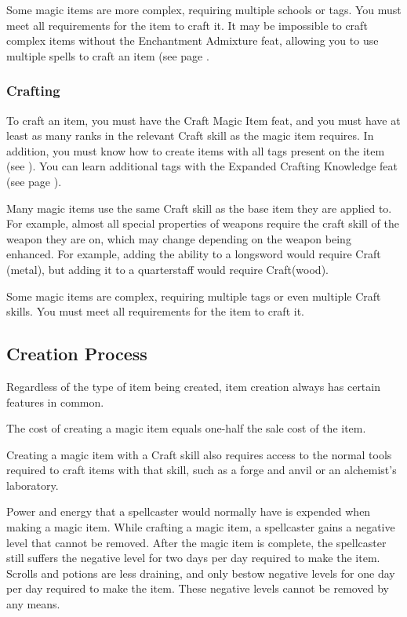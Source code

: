     Some magic items are more complex, requiring multiple schools or tags. You must meet all requirements for the item to craft it. It may be impossible to craft complex items without the Enchantment Admixture feat, allowing you to use multiple spells to craft an item (see page .

\subsubsection{Crafting}
    To craft an item, you must have the Craft Magic Item feat, and you must have at least as many ranks in the relevant Craft skill as the magic item requires.
    In addition, you must know how to create items with all tags present on the item (see ).
    You can learn additional tags with the Expanded Crafting Knowledge feat (see page ).

    Many magic items use the same Craft skill as the base item they are applied to. For example, almost all special properties of weapons require the craft skill of the weapon they are on, which may change depending on the weapon being enhanced. For example, adding the  ability to a longsword would require Craft (metal), but adding it to a quarterstaff would require Craft(wood).

    Some magic items are complex, requiring multiple tags or even multiple Craft skills. You must meet all requirements for the item to craft it.

\subsection{Creation Process}
Regardless of the type of item being created, item creation always has certain features in common.

 The cost of creating a magic item equals one-half the sale cost of the item.

Creating a magic item with a Craft skill also requires access to the normal tools required to craft items with that skill, such as a forge and anvil or an alchemist's laboratory.

 Power and energy that a spellcaster would normally have is expended when making a magic item. While crafting a magic item, a spellcaster gains a negative level that cannot be removed. After the magic item is complete, the spellcaster still suffers the negative level for two days per day required to make the item. Scrolls and potions are less draining, and only bestow negative levels for one day per day required to make the item. These negative levels cannot be removed by any means.

